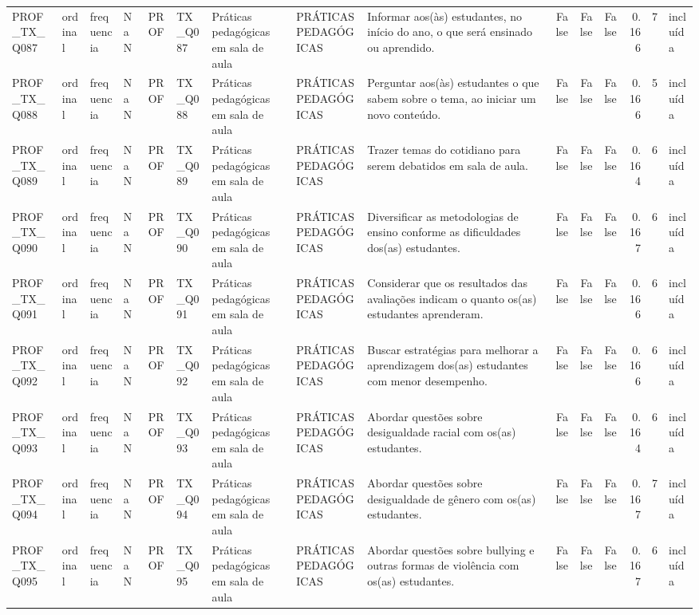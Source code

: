 \begin{tabular}{lllllllllrrrrrl}
PROF\_TX\_Q087 & ordinal & frequencia & NaN & PROF & TX\_Q087 & Práticas pedagógicas em sala de aula & PRÁTICAS PEDAGÓGICAS & Informar aos(às) estudantes, no início do ano, o que será  ensinado ou aprendido. & False & False & False & 0.166 & 7 & incluída \\
PROF\_TX\_Q088 & ordinal & frequencia & NaN & PROF & TX\_Q088 & Práticas pedagógicas em sala de aula & PRÁTICAS PEDAGÓGICAS & Perguntar aos(às) estudantes o que sabem sobre o tema, ao iniciar um novo conteúdo. & False & False & False & 0.166 & 5 & incluída \\
PROF\_TX\_Q089 & ordinal & frequencia & NaN & PROF & TX\_Q089 & Práticas pedagógicas em sala de aula & PRÁTICAS PEDAGÓGICAS & Trazer temas do cotidiano para serem debatidos em sala de aula. & False & False & False & 0.164 & 6 & incluída \\
PROF\_TX\_Q090 & ordinal & frequencia & NaN & PROF & TX\_Q090 & Práticas pedagógicas em sala de aula & PRÁTICAS PEDAGÓGICAS & Diversificar as metodologias de ensino conforme as dificuldades dos(as) estudantes. & False & False & False & 0.167 & 6 & incluída \\
PROF\_TX\_Q091 & ordinal & frequencia & NaN & PROF & TX\_Q091 & Práticas pedagógicas em sala de aula & PRÁTICAS PEDAGÓGICAS & Considerar que os resultados das avaliações indicam o quanto os(as) estudantes aprenderam. & False & False & False & 0.166 & 6 & incluída \\
PROF\_TX\_Q092 & ordinal & frequencia & NaN & PROF & TX\_Q092 & Práticas pedagógicas em sala de aula & PRÁTICAS PEDAGÓGICAS & Buscar estratégias para melhorar a aprendizagem dos(as) estudantes com menor desempenho. & False & False & False & 0.166 & 6 & incluída \\
PROF\_TX\_Q093 & ordinal & frequencia & NaN & PROF & TX\_Q093 & Práticas pedagógicas em sala de aula & PRÁTICAS PEDAGÓGICAS & Abordar questões sobre desigualdade racial com os(as) estudantes. & False & False & False & 0.164 & 6 & incluída \\
PROF\_TX\_Q094 & ordinal & frequencia & NaN & PROF & TX\_Q094 & Práticas pedagógicas em sala de aula & PRÁTICAS PEDAGÓGICAS & Abordar questões sobre desigualdade de gênero com os(as) estudantes. & False & False & False & 0.167 & 7 & incluída \\
PROF\_TX\_Q095 & ordinal & frequencia & NaN & PROF & TX\_Q095 & Práticas pedagógicas em sala de aula & PRÁTICAS PEDAGÓGICAS & Abordar questões sobre bullying e outras formas de violência com os(as)  estudantes. & False & False & False & 0.167 & 6 & incluída \\

\end{tabular}
